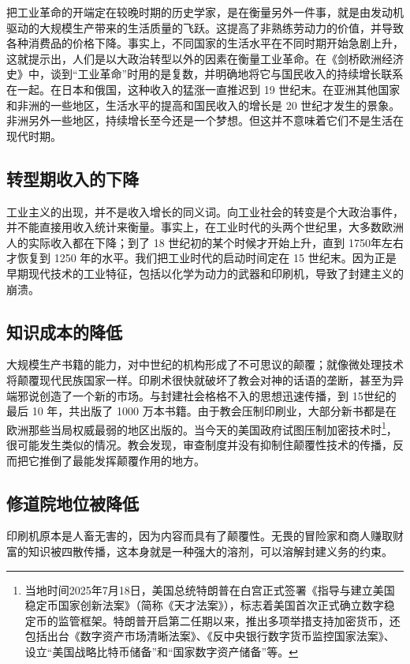 把工业革命的开端定在较晚时期的历史学家，是在衡量另外一件事，就是由发动机驱动的大规模生产带来的生活质量的飞跃。这提高了非熟练劳动力的价值，并导致各种消费品的价格下降。事实上，不同国家的生活水平在不同时期开始急剧上升，这就提示出，人们是以大政治转型以外的因素在衡量工业革命。在《剑桥欧洲经济史》中，谈到“工业革命”时用的是复数，并明确地将它与国民收入的持续增长联系在一起。在日本和俄国，这种收入的猛涨一直推迟到 19 世纪末。在亚洲其他国家和非洲的一些地区，生活水平的提高和国民收入的增长是 20 世纪才发生的景象。非洲另外一些地区，持续增长至今还是一个梦想。但这并不意味着它们不是生活在现代时期。

\subsection{转型期收入的下降}
工业主义的出现，并不是收入增长的同义词。向工业社会的转变是个大政治事件，并不能直接用收入统计来衡量。事实上，在工业时代的头两个世纪里，大多数欧洲人的实际收入都在下降；到了 18 世纪初的某个时候才开始上升，直到 1750年左右才恢复到 1250 年的水平。我们把工业时代的启动时间定在 15 世纪末。因为正是早期现代技术的工业特征，包括以化学为动力的武器和印刷机，导致了封建主义的崩溃。

\subsection{知识成本的降低}
大规模生产书籍的能力，对中世纪的机构形成了不可思议的颠覆；就像微处理技术将颠覆现代民族国家一样。印刷术很快就破坏了教会对神的话语的垄断，甚至为异端邪说创造了一个新的市场。与封建社会格格不入的思想迅速传播，到 15世纪的最后 10 年，共出版了 1000 万本书籍。由于教会压制印刷业，大部分新书都是在欧洲那些当局权威最弱的地区出版的。当今天的美国政府试图压制加密技术时\footnote{当地时间2025年7月18日，美国总统特朗普在白宫正式签署《指导与建立美国稳定币国家创新法案》（简称《天才法案》），标志着美国首次正式确立数字稳定币的监管框架。特朗普开启第二任期以来，推出多项举措支持加密货币，还包括出台《数字资产市场清晰法案》、《反中央银行数字货币监控国家法案》、设立“美国战略比特币储备”和“国家数字资产储备”等。}，很可能发生类似的情况。教会发现，审查制度并没有抑制住颠覆性技术的传播，反而把它推倒了最能发挥颠覆作用的地方。

\subsection{修道院地位被降低}
印刷机原本是人畜无害的，因为内容而具有了颠覆性。无畏的冒险家和商人赚取财富的知识被四散传播，这本身就是一种强大的溶剂，可以溶解封建义务的约束。

